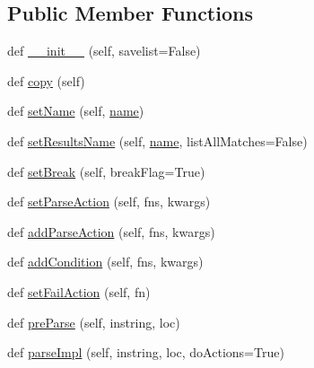 \subsection*{Public Member Functions}
\begin{DoxyCompactItemize}
\item 
def \hyperlink{classsetuptools_1_1__vendor_1_1pyparsing_1_1ParserElement_ab84851b66a664b165f782ec593458782}{\+\_\+\+\_\+init\+\_\+\+\_\+} (self, savelist=False)
\item 
def \hyperlink{classsetuptools_1_1__vendor_1_1pyparsing_1_1ParserElement_a8bb074071dc9fc5f473a5e93459b8ddb}{copy} (self)
\item 
def \hyperlink{classsetuptools_1_1__vendor_1_1pyparsing_1_1ParserElement_ab346e0dc4858607df91e45997f921727}{set\+Name} (self, \hyperlink{classsetuptools_1_1__vendor_1_1pyparsing_1_1ParserElement_aeff22f349cb2211b65b16b2eadc52ee5}{name})
\item 
def \hyperlink{classsetuptools_1_1__vendor_1_1pyparsing_1_1ParserElement_a3c4dc5305a3369fad37fc46442079a69}{set\+Results\+Name} (self, \hyperlink{classsetuptools_1_1__vendor_1_1pyparsing_1_1ParserElement_aeff22f349cb2211b65b16b2eadc52ee5}{name}, list\+All\+Matches=False)
\item 
def \hyperlink{classsetuptools_1_1__vendor_1_1pyparsing_1_1ParserElement_a1f7a4070fece9d0194863d4dc41cd830}{set\+Break} (self, break\+Flag=True)
\item 
def \hyperlink{classsetuptools_1_1__vendor_1_1pyparsing_1_1ParserElement_aeb240cc333ab3c73d5955f00b2dbf1e4}{set\+Parse\+Action} (self, fns, kwargs)
\item 
def \hyperlink{classsetuptools_1_1__vendor_1_1pyparsing_1_1ParserElement_a350ff60fb199c182d996530bc63166f5}{add\+Parse\+Action} (self, fns, kwargs)
\item 
def \hyperlink{classsetuptools_1_1__vendor_1_1pyparsing_1_1ParserElement_a6ade32202c2ff37b7466d8cf13efa000}{add\+Condition} (self, fns, kwargs)
\item 
def \hyperlink{classsetuptools_1_1__vendor_1_1pyparsing_1_1ParserElement_a44066b87aa19c3aaa008d0a7bda1cc6d}{set\+Fail\+Action} (self, fn)
\item 
def \hyperlink{classsetuptools_1_1__vendor_1_1pyparsing_1_1ParserElement_a57915fb94be663017a485d39ebfa08eb}{pre\+Parse} (self, instring, loc)
\item 
def \hyperlink{classsetuptools_1_1__vendor_1_1pyparsing_1_1ParserElement_a142fa33eac24d4ca11afd6f0d86bf547}{parse\+Impl} (self, instring, loc, do\+Actions=True)
\item 

\end{DoxyCompactItemize}
